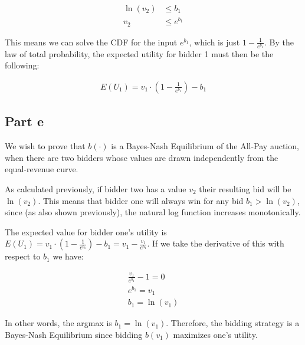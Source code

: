 \documentclass[12pt]{article}%
\begin{document}
\begin{equation}
\begin{split}
\ln(v_2) &\le b_1\\
v_2 &\le e^{b_1}
\end{split}
\end{equation}

This means we can  solve the CDF for the input $e^{b_1}$, which is just $1 - \frac{1}{e^{b_1}}$. By the law of total probability, the expected utility for bidder 1 must then be the following:

\begin{equation}
\begin{split}
E(U_1) = v_1 \cdot (1 - \frac{1}{e^{b_1}}) - b_1
\end{split}
\end{equation}

\subsection*{Part e}

We wish to prove that $b(\cdot)$ is a Bayes-Nash Equilibrium of the All-Pay auction, when there are two bidders whose values are drawn independently from the equal-revenue curve.

As calculated previously, if bidder two has a value $v_2$ their resulting bid will be $\ln(v_2)$. This means that bidder one will always win for any bid $b_1 > \ln(v_2)$, since (as also shown previously), the natural log function increases monotonically.

The expected value for bidder one's utility is $E(U_1) = v_1 \cdot (1 - \frac{1}{e^{b_1}}) - b_1 = v_1 - \frac{v_1}{e^{b_1}}$. If we take the derivative of this with respect to $b_1$ we have:

\begin{equation}
\begin{split}
\frac{v_1}{e^{b_1}} - 1 = 0\\
e^{b_1} = v_1\\
b_1 = \ln(v_1)
\end{split}
\end{equation}

In other words, the argmax is $b_1 = \ln(v_1)$. Therefore, the bidding strategy is a Bayes-Nash Equilibrium since bidding $b(v_1)$ maximizes one's utility.
\end{document}
